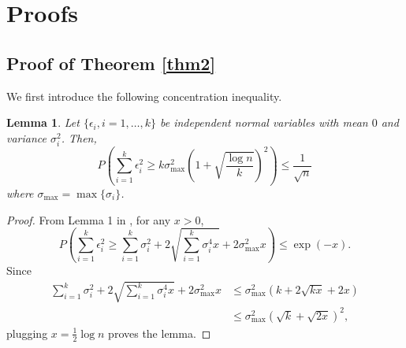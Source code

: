 \documentclass{article}
\newtheorem{lem}{Lemma}
\begin{document}
\ificml
\else
    \clearpage
\fi






\appendix
\onecolumn
\section{Proofs}

\subsection{Proof of Theorem \ref{thm2}} \label{app1}

We first introduce the following concentration inequality.

\begin{lem}\label{concent}
Let $\{\epsilon_i, i = 1,\ldots,k\}$ be independent normal variables with mean $0$ and variance $\sigma_i^2$.
Then,
\[P\left(\sum_{i=1}^k \epsilon_i^2 \geq k\sigma_{\max}^2 \left(1+\sqrt{\frac{\log n}{k}}\right)^2 \right) \leq \frac{1}{\sqrt{n}}\]
where $\sigma_{\max} = \max\{\sigma_i\}$.
\end{lem}
\begin{proof}
From Lemma 1 in \citet{laurent}, for any $x > 0$,
\[P\left(\sum_{i=1}^k \epsilon_i^2 \geq \sum_{i=1}^k \sigma_i^2 + 2\sqrt{\sum_{i=1}^k \sigma_i^4 x} + 2\sigma_{\max}^2 x\right) \leq \exp(-x).\]
Since
\begin{align*}
\sum_{i=1}^k \sigma_i^2 + 2\sqrt{\sum_{i=1}^k \sigma_i^4 x} + 2\sigma_{\max}^2 x &\leq \sigma_{\max}^2(k+2\sqrt{kx}+2x)\\
&\leq \sigma_{\max}^2(\sqrt{k}+\sqrt{2x})^2,
\end{align*}
plugging $x=\frac{1}{2}\log n$ proves the lemma.

\end{proof}
\end{document}

